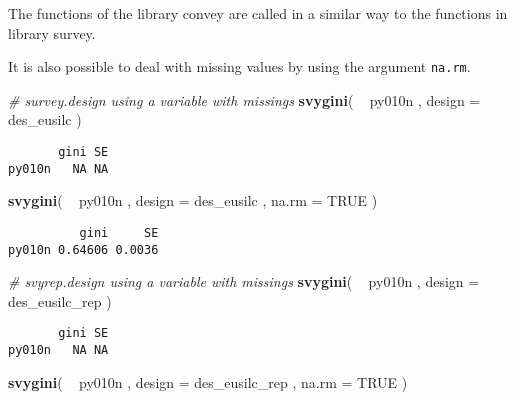 \documentclass[]{book}
\newenvironment{Shaded}{\begin{snugshade}}{\end{snugshade}}
\newcommand{\KeywordTok}[1]{\textcolor[rgb]{0.13,0.29,0.53}{\textbf{{#1}}}}
\newcommand{\DataTypeTok}[1]{\textcolor[rgb]{0.13,0.29,0.53}{{#1}}}
\newcommand{\StringTok}[1]{\textcolor[rgb]{0.31,0.60,0.02}{{#1}}}
\newcommand{\CommentTok}[1]{\textcolor[rgb]{0.56,0.35,0.01}{\textit{{#1}}}}
\newcommand{\OtherTok}[1]{\textcolor[rgb]{0.56,0.35,0.01}{{#1}}}
\newcommand{\NormalTok}[1]{{#1}}
\theoremstyle{definition}
\theoremstyle{definition}
\theoremstyle{remark}
\begin{document}
The functions of the library convey are called in a similar way to the
functions in library survey.

It is also possible to deal with missing values by using the argument
\texttt{na.rm}.

\begin{Shaded}
\begin{Highlighting}[]
\CommentTok{# survey.design using a variable with missings}
\KeywordTok{svygini}\NormalTok{( ~}\StringTok{ }\NormalTok{py010n , }\DataTypeTok{design =} \NormalTok{des_eusilc )}
\end{Highlighting}
\end{Shaded}

\begin{verbatim}
       gini SE
py010n   NA NA
\end{verbatim}

\begin{Shaded}
\begin{Highlighting}[]
\KeywordTok{svygini}\NormalTok{( ~}\StringTok{ }\NormalTok{py010n , }\DataTypeTok{design =} \NormalTok{des_eusilc , }\DataTypeTok{na.rm =} \OtherTok{TRUE} \NormalTok{)}
\end{Highlighting}
\end{Shaded}

\begin{verbatim}
          gini     SE
py010n 0.64606 0.0036
\end{verbatim}

\begin{Shaded}
\begin{Highlighting}[]
\CommentTok{# svyrep.design using a variable with missings}
\KeywordTok{svygini}\NormalTok{( ~}\StringTok{ }\NormalTok{py010n , }\DataTypeTok{design =} \NormalTok{des_eusilc_rep )}
\end{Highlighting}
\end{Shaded}

\begin{verbatim}
       gini SE
py010n   NA NA
\end{verbatim}

\begin{Shaded}
\begin{Highlighting}[]
\KeywordTok{svygini}\NormalTok{( ~}\StringTok{ }\NormalTok{py010n , }\DataTypeTok{design =} \NormalTok{des_eusilc_rep , }\DataTypeTok{na.rm =} \OtherTok{TRUE} \NormalTok{)}
\end{Highlighting}
\end{Shaded}
\end{document}

